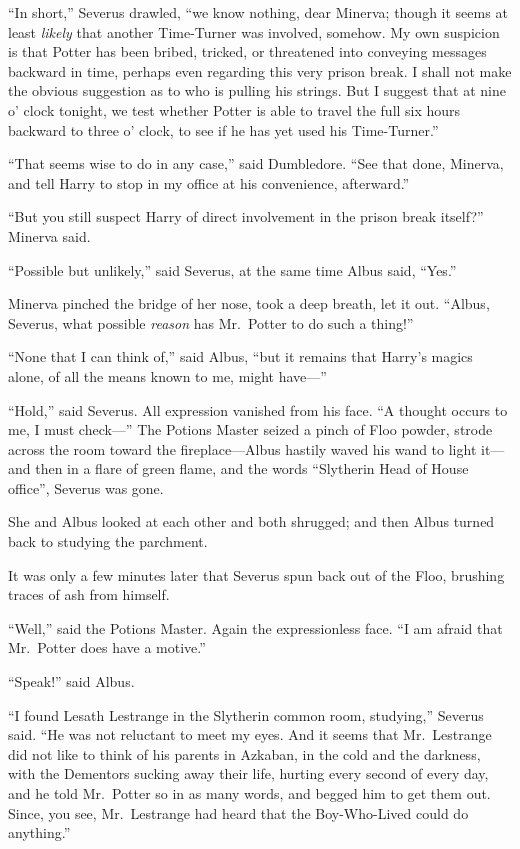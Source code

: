 ``In short,'' Severus drawled, ``we know nothing, dear Minerva; though
it seems at least \emph{likely} that another Time-Turner was involved,
somehow. My own suspicion is that Potter has been bribed, tricked, or
threatened into conveying messages backward in time, perhaps even
regarding this very prison break. I shall not make the obvious
suggestion as to who is pulling his strings. But I suggest that at nine
o' clock tonight, we test whether Potter is able to travel the full six
hours backward to three o' clock, to see if he has yet used his
Time-Turner.''

``That seems wise to do in any case,'' said Dumbledore. ``See that done,
Minerva, and tell Harry to stop in my office at his convenience,
afterward.''

``But you still suspect Harry of direct involvement in the prison break
itself?'' Minerva said.

``Possible but unlikely,'' said Severus, at the same time Albus said,
``Yes.''

Minerva pinched the bridge of her nose, took a deep breath, let it out.
``Albus, Severus, what possible \emph{reason} has Mr.~Potter to do such
a thing!''

``None that I can think of,'' said Albus, ``but it remains that Harry's
magics alone, of all the means known to me, might have---''

``Hold,'' said Severus. All expression vanished from his face. ``A
thought occurs to me, I must check---'' The Potions Master seized a
pinch of Floo powder, strode across the room toward the
fireplace---Albus hastily waved his wand to light it---and then in a
flare of green flame, and the words ``Slytherin Head of House office'',
Severus was gone.

She and Albus looked at each other and both shrugged; and then Albus
turned back to studying the parchment.

It was only a few minutes later that Severus spun back out of the Floo,
brushing traces of ash from himself.

``Well,'' said the Potions Master. Again the expressionless face. ``I am
afraid that Mr.~Potter does have a motive.''

``Speak!'' said Albus.

``I found Lesath Lestrange in the Slytherin common room, studying,''
Severus said. ``He was not reluctant to meet my eyes. And it seems that
Mr.~Lestrange did not like to think of his parents in Azkaban, in the
cold and the darkness, with the Dementors sucking away their life,
hurting every second of every day, and he told Mr.~Potter so in as many
words, and begged him to get them out. Since, you see, Mr.~Lestrange had
heard that the Boy-Who-Lived could do anything.''

